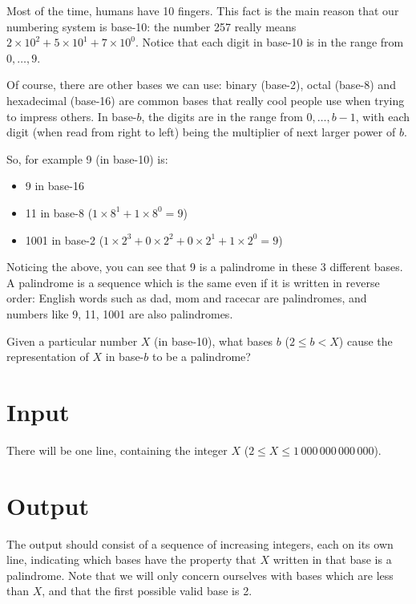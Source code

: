 
Most of the time, humans have 10 fingers. This fact is the main reason that our
numbering system is base-10: the number 257 really means $2 \times 10^2 + 5 \times 10^1 + 7
\times 10^0$. Notice that each digit in base-10 is in the range from $0,\ldots,9$.

Of course, there are other bases we can use: binary (base-2), octal (base-8)
and hexadecimal (base-16) are common bases that really cool people use when
trying to impress others. In base-$b$, the digits are in the range from $0,\ldots,b-1$,
with each digit (when read from right to left) being the multiplier of next
larger power of $b$.

So, for example 9 (in base-10) is:
\begin{itemize}
\item 9 in base-16
\item 11 in base-8 ($1 \times 8^1 + 1 \times 8^0 = 9$)
\item 1001 in base-2 ($1 \times 2^3 + 0 \times 2^2 + 0 \times 2^1 + 1 \times 2^0 = 9$)
\end{itemize}

Noticing the above, you can see that 9 is a palindrome in these 3 different
bases. A palindrome is a sequence which is the same even if it is written in
reverse order: English words such as dad, mom and racecar are palindromes, and
numbers like 9, 11, 1001 are also palindromes.

Given a particular number $X$ (in base-10), what bases $b$ ($2 \leq b < X$) cause the
representation of $X$ in base-$b$ to be a palindrome?

\section*{Input}

There will be one line, containing the integer $X$ ($2 \leq X \leq 1\,000\,000\,000\,000$).

\section*{Output}

The output should consist of a sequence of increasing integers, each on its own
line, indicating which bases have the property that $X$ written in that base is a
palindrome. Note that we will only concern ourselves with bases which are less
than $X$, and that the first possible valid base is 2.

